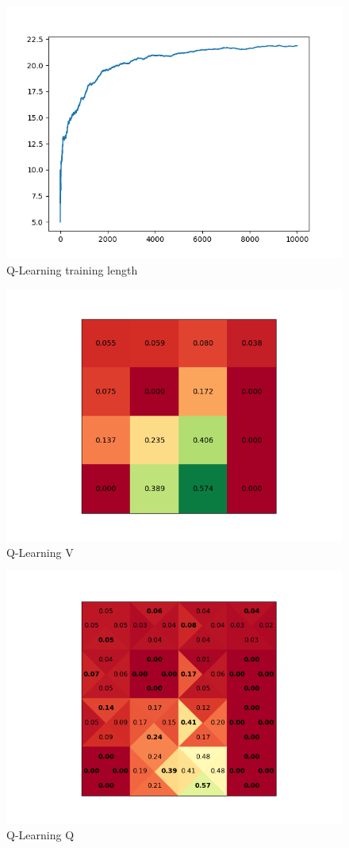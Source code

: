 \documentclass[a4paper]{article}
\begin{document}
\begin{figure}[!ht]
	\centering
	\includegraphics[width=0.8\linewidth]{4x4_qlearn_length}
	\caption{Q-Learning training length}
	\label{fig:qlearnlength}
\end{figure}
\begin{figure}[!ht]
	\centering
	\includegraphics[width=0.6\linewidth]{4x4_qlearn_v}
	\caption{Q-Learning V}
	\label{fig:qlearnreward}
\end{figure}
\begin{figure}[!ht]
	\centering
	\includegraphics[width=0.6\linewidth]{4x4_qlearn_q}
	\caption{Q-Learning Q}
	\label{fig:qlearnpolicy}
\end{figure}
\end{document}
